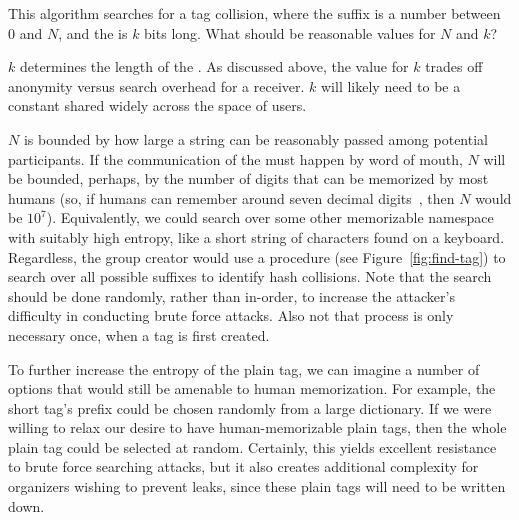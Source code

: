 %
This algorithm searches for a tag collision, where the  suffix is
a number between 0 and $N$, and the  is $k$ bits long.
What should be reasonable values for $N$ and $k$?

$k$ determines the length of the . As discussed above, the value for $k$
trades off anonymity versus search overhead for a receiver. $k$ will likely need to be
a constant shared widely across the space of \hoot users.

$N$ is bounded by how large a  string can be reasonably
passed among potential \hoot participants. If the communication of the
 must happen by word of mouth, $N$ will be bounded,
perhaps, by the number of digits that can be memorized by most humans
(so, if humans can remember around seven decimal
digits~\cite{miller56}, then $N$ would be $10^7$). Equivalently, we
could search over some other memorizable namespace with suitably high
entropy, like a short string of characters found on a keyboard.
Regardless, the group creator would use a  procedure (see
Figure~\ref{fig:find-tag}) to search over all possible suffixes to
identify hash collisions. Note that the search should be done
randomly, rather than in-order, to increase the attacker's difficulty
in conducting brute force attacks. Also not that process is only
necessary once, when a tag is first created. 

To further increase the entropy of the plain tag, we can imagine a
number of options that would still be amenable to human
memorization. For example, the short tag's prefix could be chosen
randomly from a large dictionary.  If we were willing to relax our
desire to have human-memorizable plain tags, then the whole plain tag
could be selected at random.  Certainly, this yields excellent
resistance to brute force searching attacks, but it also creates
additional complexity for organizers wishing to prevent leaks, since
these plain tags will need to be written down. 

